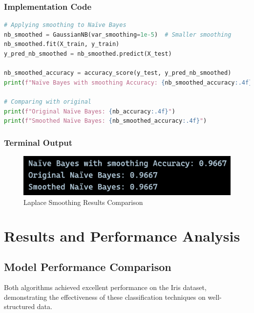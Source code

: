 \documentclass[12pt,a4paper]{article}
\begin{document}
\subsubsection{Implementation Code}
\begin{lstlisting}[language=Python, caption=Apply Laplace Smoothing]
# Applying smoothing to Naïve Bayes
nb_smoothed = GaussianNB(var_smoothing=1e-5)  # Smaller smoothing
nb_smoothed.fit(X_train, y_train)
y_pred_nb_smoothed = nb_smoothed.predict(X_test)

nb_smoothed_accuracy = accuracy_score(y_test, y_pred_nb_smoothed)
print(f"Naïve Bayes with smoothing Accuracy: {nb_smoothed_accuracy:.4f}")

# Comparing with original
print(f"Original Naïve Bayes: {nb_accuracy:.4f}")
print(f"Smoothed Naïve Bayes: {nb_smoothed_accuracy:.4f}")
\end{lstlisting}

\subsubsection{Terminal Output}

\begin{figure}[h!]
    \centering
    \includegraphics[width=\textwidth]{Figures/smoothing.png}
    \caption{Laplace Smoothing Results Comparison}
\end{figure}

\section{Results and Performance Analysis}

\subsection{Model Performance Comparison}

Both algorithms achieved excellent performance on the Iris dataset, demonstrating the effectiveness of these classification techniques on well-structured data.
\end{document}
